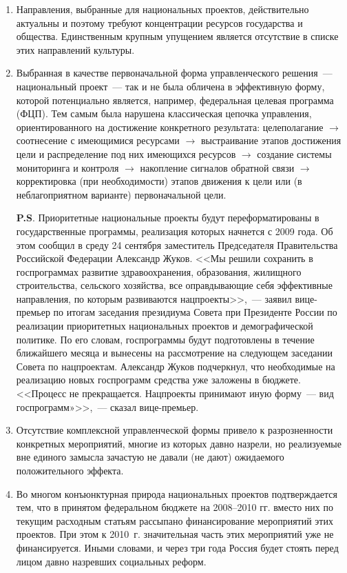 \documentclass[article, 12pt, russian, oneside]{ncc}
\begin{document}
\begin{enumerate}
\item Направления, выбранные для национальных проектов, действительно
  актуальны и поэтому требуют концентрации ресурсов государства и
  общества. Единственным крупным упущением является отсутствие в
  списке этих направлений культуры.

\item Выбранная в качестве первоначальной форма управленческого
  решения~--- национальный проект~--- так и не была обличена в
  эффективную форму, которой потенциально является, например,
  федеральная целевая программа (ФЦП). Тем самым была нарушена
  классическая цепочка управления, ориентированного на достижение
  конкретного результата: целеполагание $\rightarrow$ соотнесение с
  имеющимися ресурсами $\rightarrow$ выстраивание этапов достижения
  цели и распределение под них имеющихся ресурсов $\rightarrow$
  создание системы мониторинга и контроля $\rightarrow$ накопление
  сигналов обратной связи $\rightarrow$ корректировка (при
  необходимости) этапов движения к цели или (в неблагоприятном
  варианте) первоначальной цели.

  \textbf{P.S}. Приоритетные национальные проекты будут переформатированы в
  государственные программы, реализация которых начнется с 2009
  года. Об этом сообщил в среду 24 сентября заместитель Председателя
  Правительства Российской Федерации Александр Жуков. <<Мы решили
  сохранить в госпрограммах развитие здравоохранения, образования,
  жилищного строительства, сельского хозяйства, все оправдывающие себя
  эффективные направления, по которым развиваются нацпроекты>>,~---
  заявил вице-премьер по итогам заседания президиума Совета при
  Президенте России по реализации приоритетных национальных проектов и
  демографической политике. По его словам, госпрограммы будут
  подготовлены в течение ближайшего месяца и вынесены на рассмотрение
  на следующем заседании Совета по нацпроектам. Александр Жуков
  подчеркнул, что необходимые на реализацию новых госпрограмм средства
  уже заложены в бюджете. <<Процесс не прекращается. Нацпроекты
  принимают иную форму~--- вид госпрограмм»>>,~--- сказал
  вице-премьер.

\item Отсутствие комплексной управленческой формы привело к
  разрозненности конкретных мероприятий, многие из которых давно
  назрели, но реализуемые вне единого замысла зачастую не давали (не
  дают) ожидаемого положительного эффекта.

\item Во многом конъюнктурная природа национальных проектов
  подтверждается тем, что в принятом федеральном бюджете на 2008--2010
  гг. вместо них по текущим расходным статьям рассыпано финансирование
  мероприятий этих проектов. При этом к 2010~г. значительная часть
  этих мероприятий уже не финансируется. Иными словами, и через три
  года Россия будет стоять перед лицом давно назревших социальных
  реформ.


\end{enumerate}
\end{document}
